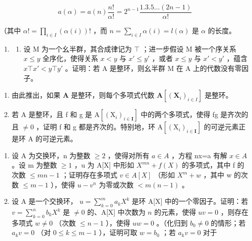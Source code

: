 \[
a (\alpha) = a (n) \frac {n !}{\alpha !} = 2 ^ {n - 1} \frac {1 . 3 . 5 \dots (2 n - 1)}{\alpha !}
\]

（其中 \(\alpha! = \prod_{i \in I} (\alpha(i))!\) ，而 \(n = \sum_{i \in I} \alpha(i) = l(\alpha)\) 是 \(\alpha\) 的长度。

\begin{enumerate}
\def\labelenumi{\arabic{enumi}.}
\setcounter{enumi}{13}
\tightlist
\item
  \begin{enumerate}
  \def\labelenumii{(\alph{enumii})}
  \tightlist
  \item
    设 M 为一个幺半群，其合成律记为 \(\top\) ；进一步假设 M 被一个序关系 \(x \leqslant y\) 全序化，使得关系 \(x < y\) 与 \(x' \leqslant y'\) ，或者 \(x \leqslant y\) 与 \(x' < y'\) ，蕴含 \(x \top x' < y \top y'\) 。证明：若 A 是整环，则幺半群 M 在 A 上的代数没有零因子。
  \end{enumerate}
\end{enumerate}

\begin{enumerate}
\def\labelenumi{(\alph{enumi})}
\setcounter{enumi}{1}
\item
  由此推出，如果 \(\mathbf{A}\) 是整环，则每个多项式代数 \(\mathbf{A}[(\mathbf{X}_i)_{i\in I}]\) 是整环。
\item
  若 A 是整环，且 f 和 g 是 \(\mathrm{A}[(\mathrm{X}_{i})_{i\in\mathbf{I}}]\) 中的两个多项式，使得 fg 是齐次的且 \(\neq0\) ，证明 f 和 g 都是齐次的。特别地，环 \(\mathrm{A}[(\mathrm{X}_{i})_{i\in\mathbf{I}}]\) 的可逆元素正是环 A 的可逆元素。
\end{enumerate}

\begin{enumerate}
\def\labelenumi{\arabic{enumi}.}
\setcounter{enumi}{14}
\item
  设 A 为交换环，n 为整数 \(\geqslant2\) ，使得对所有 \(a\in A\) ，方程 nx=a 有解 \(x\in A\) 。设 m 为整数 \(\geqslant1\) ，u 为 A{[}X{]} 中形如 \(X^{mn}+f(X)\) 的多项式，其中 f 的次数 \(\leqslant mn-1\) ；证明存在多项式 \(v\in A[X]\) （形如 \(X^{m}+w\) ，其中 w 的次数 \(\leqslant m-1\) ），使得 \(u-v^{n}\) 为零或次数 \(<m(n-1)\) 。
\item
  设 A 是一个交换环， \(u = \sum_{k=0}^{m} a_k X^k\) 是环 A{[}X{]} 中的一个零因子。证明：若 \(v = \sum_{k=0}^{n} b_k X^k\) 是 \(\neq 0\) 的、A{[}X{]} 中次数为 \(n\) 的元素，使得 \(uv = 0\) ，则存在多项式 \(w \neq 0\) （次数 \(\leqslant n - 1\) ），使得 \(uw = 0\) 。（化归到 \(b_0 \neq 0\) 的情形；若 \(a_k v = 0\) （对 \(0 \leqslant k \leqslant m - 1\) ），证明可取 \(w = b_0\) ；若 \(a_k v = 0\) 对于
\end{enumerate}

